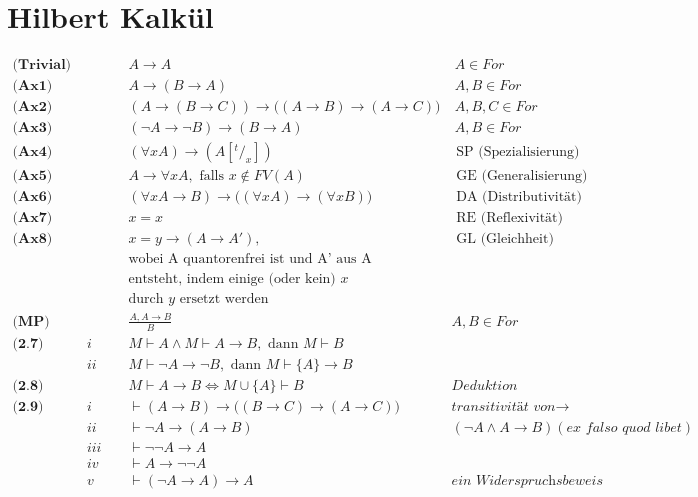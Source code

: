 \documentclass{article}
\begin{document}
	\section{Hilbert Kalk\"ul}
		\begin{align*}
			\textbf{(Trivial) } & & & A \rightarrow A &\ A \in For \\
			\textbf{(Ax1) } & & & A \rightarrow (B \rightarrow A) &\ A, B \in For\\
			\textbf{(Ax2) } & & & (A \rightarrow (B \rightarrow C)) \rightarrow \Big((A \rightarrow B) \rightarrow (A \rightarrow C)\Big) &\ A, B, C \in For\\
			\textbf{(Ax3) } & & & (\neg A \rightarrow \neg B ) \rightarrow (B \rightarrow A) &\ A, B \in For\\
			\textbf{(Ax4) } & & & (\forall x A) \rightarrow (A[^t/_x]) & \text{ SP (Spezialisierung)}\\
			\textbf{(Ax5) } & & & A \rightarrow \forall x A, \text{ falls } x \not \in FV(A) & \text{ GE (Generalisierung)}\\
			\textbf{(Ax6) } & & & (\forall x A \rightarrow B) \rightarrow \Big( ( \forall x A ) \rightarrow (\forall x B) \Big) & \text{ DA (Distributivit\"at)}\\
			\textbf{(Ax7) } & & & x = x & \text{ RE (Reflexivit\"at)}\\
			\textbf{(Ax8) } & & & x = y \rightarrow (A \rightarrow A'), & \text{ GL (Gleichheit)}\\
			& & & \text{wobei A quantorenfrei ist und A' aus A}\\
			& & & \text{entsteht, indem einige (oder kein) } x \\
			& & & \text{durch } y \text{ ersetzt werden }\\
			\textbf{(MP) } & & & \frac{A, A \rightarrow B}{B} & A, B \in For \\
			\textbf{(2.7) } & \textit{i } & & M \vdash A \wedge M \vdash A \rightarrow B, \text{ dann }  M \vdash B\\
			& \textit{ii } & & M \vdash \neg A \rightarrow \neg B, \text{ dann }  M \vdash \{A\} \rightarrow B\\
			\textbf{(2.8) } & & & M \vdash A \rightarrow B \Leftrightarrow M \cup \{A\} \vdash B & \textit{Deduktion}\\
			\textbf{(2.9) } & \textit{i } & & \vdash (A \rightarrow B) \rightarrow \Big( ( B \rightarrow C ) \rightarrow (A \rightarrow C) \Big) & \textit{transitivit\"at von} \rightarrow\\
			& \textit{ii } & & \vdash \neg A \rightarrow (A \rightarrow B) & (\neg A \wedge A \rightarrow B) (\textit{ex falso quod libet})\\
			& \textit{iii } & & \vdash \neg\neg A \rightarrow A\\
			& \textit{iv } & & \vdash A \rightarrow \neg\neg A\\
			& \textit{v } & & \vdash (\neg A \rightarrow A) \rightarrow A & \textit{ein Widerspruchsbeweis}\\
		\end{align*}
\end{document}
